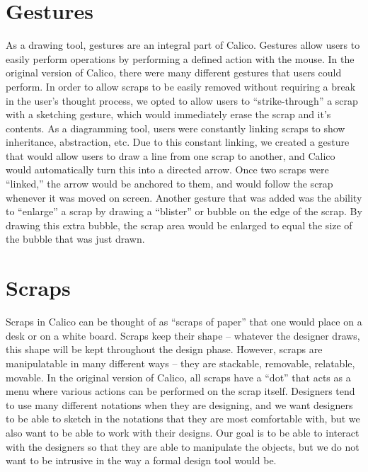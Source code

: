 \section{Gestures}
As a drawing tool, gestures are an integral part of Calico.
Gestures allow users to easily perform operations by performing a defined action with the mouse.
In the original version of Calico, there were many different gestures that users could perform.
In order to allow scraps to be easily removed without requiring a break in the user's thought process, we opted to allow users to ``strike-through'' a scrap with a sketching gesture, which would immediately erase the scrap and it's contents.
As a diagramming tool, users were constantly linking scraps to show inheritance, abstraction, etc.
Due to this constant linking, we created a gesture that would allow users to draw a line from one scrap to another, and Calico would automatically turn this into a directed arrow.
Once two scraps were ``linked,'' the arrow would be anchored to them, and would follow the scrap whenever it was moved on screen.
Another gesture that was added was the ability to ``enlarge'' a scrap by drawing a ``blister'' or bubble on the edge of the scrap.
By drawing this extra bubble, the scrap area would be enlarged to equal the size of the bubble that was just drawn.


\section{Scraps}
Scraps in Calico can be thought of as ``scraps of paper'' that one would place on a desk or on a white board.
Scraps keep their shape -- whatever the designer draws, this shape will be kept throughout the design phase.
However, scraps are manipulatable in many different ways -- they are stackable, removable, relatable, movable. 
In the original version of Calico, all scraps have a ``dot'' that acts as a menu where various actions can be performed on the scrap itself.
Designers tend to use many different notations when they are designing, and we want designers to be able to sketch in the notations that they are most comfortable with, but we also want to be able to work with their designs.
Our goal is to be able to interact with the designers so that they are able to manipulate the objects, but we do not want to be intrusive in the way a formal design tool would be.

